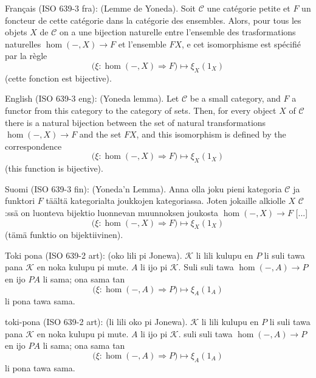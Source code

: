 \documentclass{article}
\newcommand{\tran}[3]{%
	\noindent\textsf{#1:} (#2). #3%
	\medskip\newline
}
\begin{document}
\tran{Français (ISO 639-3 fra)}{Lemme de Yoneda}{
	Soit $\mathcal C$ une catégorie petite et $F$ un foncteur de cette catégorie dans la catégorie des ensembles. Alors, pour tous les objets $X$ de $\mathcal C$ on a une bijection naturelle entre l'ensemble des trasformations naturelles $\hom(-,X)\to F$ et l'ensemble $FX$, e cet isomorphisme est spécifié par la règle
	\[
		\Big(\xi : \hom(-,X)\Rightarrow F\Big) \mapsto \xi_X(1_X)
	\]
	(cette fonction est bijective).
}
\tran{English (ISO 639-3 eng)}{Yoneda lemma}{
Let $\mathcal C$ be a small category, and $F$ a functor from this category to the category of sets. Then, for every object $X$ of $\mathcal C$ there is a natural bijection between the set of natural transformations $\hom(-,X)\to F$ and the set $FX$, and this isomorphism is defined by the correspondence
\[
	\Big(\xi : \hom(-,X)\Rightarrow F\Big) \mapsto \xi_X(1_X)
\]
(this function is bijective).
}
\tran{Suomi (ISO 639-3 fin)}{Yoneda'n Lemma}{
	Anna olla joku pieni kategoria $\mathcal C$ ja funktori $F$ täältä kategorialta joukkojen kategoriassa. Joten jokaille alkiolle $X$ $\mathcal C$:ssä on luonteva bijektio luonnevan muunnoksen joukosta $\hom(-,X)\to F$ [...]
	\[
		\Big(\xi : \hom(-,X)\Rightarrow F\Big) \mapsto \xi_X(1_X)
	\]
	(tämä funktio on bijektiivinen).
}
\tran{Toki pona (ISO 639-2 art)}{oko lili pi Jonewa}{$\mathcal K$ li lili kulupu en $P$ li suli tawa pana $\mathcal K$ en noka kulupu pi mute. $A$ li ijo pi $\mathcal K$. Suli suli tawa $\hom(-,A)\to P$ en ijo $PA$ li sama; ona sama tan
\[
	\Big(\xi : \hom(-,A)\Rightarrow P\Big) \mapsto \xi_A(1_A)
\]
li pona tawa sama.}
\tran{{\tp toki-pona} (ISO 639-2 art)}{{\tp li lili oko pi Jonewa}}{$\mathcal K$ {\tp li lili kulupu en} $P$ {\tp li suli tawa pana} $\mathcal K$ {\tp en noka kulupu pi mute}. $A$ {\tp li ijo pi} $\mathcal K$. {\tp suli suli tawa} $\hom(-,A)\to P$ {\tp en ijo} $PA$ {\tp li sama; ona sama tan}
\[
	\Big(\xi : \hom(-,A)\Rightarrow P\Big) \mapsto \xi_A(1_A)
\]
li pona tawa sama.}
\end{document}
